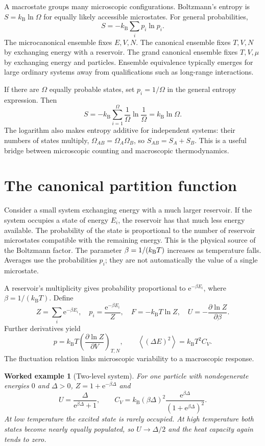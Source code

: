 \documentclass[11pt,oneside]{book}
\newcommand{\ee}{\mathrm{e}}
\newcommand{\avg}[1]{\left\langle #1\right\rangle}
\newcommand{\pd}[2]{\frac{\partial #1}{\partial #2}}
\newcommand{\kb}{k_{\mathrm B}}
\theoremstyle{reviewstyle}
\newtheorem{example}{Worked example}[chapter]
\begin{document}
A macrostate groups many microscopic configurations. Boltzmann's entropy is $S=\kb\ln\Omega$ for equally likely accessible microstates. For general probabilities,
\begin{equation}S=-\kb\sum_i p_i\ln p_i.\end{equation}
The microcanonical ensemble fixes $E,V,N$. The canonical ensemble fixes $T,V,N$ by exchanging energy with a reservoir. The grand canonical ensemble fixes $T,V,\mu$ by exchanging energy and particles. Ensemble equivalence typically emerges for large ordinary systems away from qualifications such as long-range interactions.

If there are $\Omega$ equally probable states, set $p_i=1/\Omega$ in the general entropy expression. Then
\begin{equation}
S=-\kb\sum_{i=1}^{\Omega}\frac1\Omega\ln\frac1\Omega
=\kb\ln\Omega.
\end{equation}
The logarithm also makes entropy additive for independent systems: their numbers of states multiply, $\Omega_{AB}=\Omega_A\Omega_B$, so $S_{AB}=S_A+S_B$. This is a useful bridge between microscopic counting and macroscopic thermodynamics.

\section{The canonical partition function}
Consider a small system exchanging energy with a much larger reservoir. If the system occupies a state of energy $E_i$, the reservoir has that much less energy available. The probability of the state is proportional to the number of reservoir microstates compatible with the remaining energy. This is the physical source of the Boltzmann factor. The parameter $\beta=1/(k_{\rm B}T)$ increases as temperature falls. Averages use the probabilities $p_i$; they are not automatically the value of a single microstate.

A reservoir's multiplicity gives probability proportional to $\ee^{-\beta E_i}$, where $\beta=1/(\kb T)$. Define
\begin{equation}
Z=\sum_i\ee^{-\beta E_i},\quad p_i=\frac{\ee^{-\beta E_i}}Z,\quad
F=-\kb T\ln Z,\quad U=-\pd{\ln Z}{\beta}.
\end{equation}
Further derivatives yield
\begin{equation}
p=\kb T\left(\pd{\ln Z}{V}\right)_{T,N},\qquad
\avg{(\Delta E)^2}=\kb T^2C_V.
\end{equation}
The fluctuation relation links microscopic variability to a macroscopic response.
\begin{example}[Two-level system]
For one particle with nondegenerate energies $0$ and $\Delta>0$, $Z=1+\ee^{-\beta\Delta}$ and
\begin{equation}
U=\frac{\Delta}{\ee^{\beta\Delta}+1},\qquad
C_V=\kb(\beta\Delta)^2\frac{\ee^{\beta\Delta}}{(1+\ee^{\beta\Delta})^2}.
\end{equation}
At low temperature the excited state is rarely occupied. At high temperature both states become nearly equally populated, so $U\to\Delta/2$ and the heat capacity again tends to zero.
\end{example}
\end{document}
